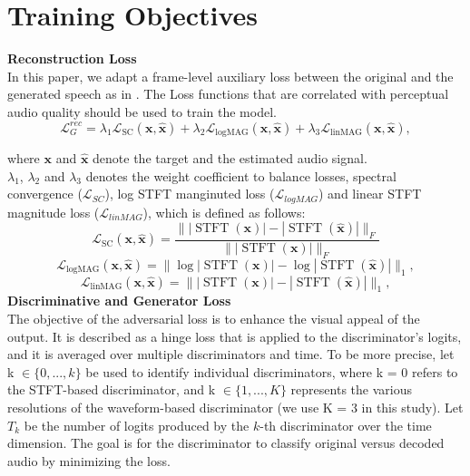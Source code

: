 \documentclass[12pt]{report}
\begin{document}
\section{Training Objectives}
\textbf{Reconstruction Loss}\\
In this paper, we adapt a frame-level auxiliary loss between the original and the generated speech as in \cite{yamamoto2019probability}. The Loss functions that are correlated with perceptual audio quality should be used to train the model.
$$
\mathcal{L}_{G}^{rec}=\lambda_{\mathrm{1}} \mathcal{L}_{\mathrm{SC}}(\boldsymbol{x}, \hat{\boldsymbol{x}})+\lambda_{\mathrm{2}} \mathcal{L}_{\mathrm{logMAG}}(\boldsymbol{x}, \hat{\boldsymbol{x}})+\lambda_{\mathrm{3}} \mathcal{L}_{\mathrm{linMAG}}(\boldsymbol{x}, \hat{\boldsymbol{x}}),                   
$$

where $\boldsymbol{x}$ and $\hat{\boldsymbol{x}}$ denote the target and the estimated audio signal. \\
$\lambda_{1}$, $\lambda_{2}$ and $\lambda_{3}$ denotes the weight coefficient to balance losses, spectral convergence ($\mathcal{L}_{SC}$), log STFT manginuted loss ($\mathcal{L}_{logMAG}$) and linear STFT magnitude loss ($\mathcal{L}_{linMAG}$), which is defined as follows:
$$
\mathcal{L}_{\mathrm{SC}}(\boldsymbol{x}, \hat{\boldsymbol{x}})=\frac{\||\operatorname{STFT}(\boldsymbol{x})|-|\operatorname{STFT}(\hat{\boldsymbol{x}})|\|_F}{\||\operatorname{STFT}(\boldsymbol{x})|\|_F}
$$
$$
\mathcal{L}_{\mathrm{logMAG}}(\boldsymbol{x}, \hat{\boldsymbol{x}})=\|\log |\operatorname{STFT}(\boldsymbol{x})|-\log |\operatorname{STFT}(\hat{\boldsymbol{x}})|\|_1,
$$
$$
\mathcal{L}_{\mathrm{linMAG}}(\boldsymbol{x}, \hat{\boldsymbol{x}})=\| |\operatorname{STFT}(\boldsymbol{x})|- |\operatorname{STFT}(\hat{\boldsymbol{x}})|\|_1,
$$
\textbf{Discriminative and Generator Loss}\\
The objective of the adversarial loss is to enhance the visual appeal of the output. It is described as a hinge loss that is applied to the discriminator's logits, and it is averaged over multiple discriminators and time. To be more precise, let k  $\in \big\{0,. . . , k\big\}$ be used to identify individual discriminators, where k = 0 refers to the STFT-based discriminator, and k $\in \big\{1, . . . , K\big\}$ represents the various resolutions of the waveform-based discriminator (we use K = 3 in this study). Let $T_k$ be the number of logits produced by the $k$-th discriminator over the time dimension. The goal is for the discriminator to classify original versus decoded audio by minimizing the loss.
\end{document}
